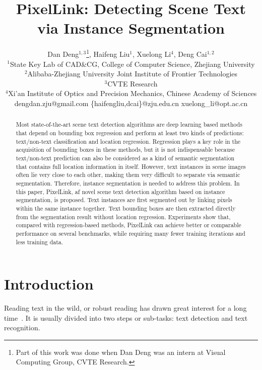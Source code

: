 \documentclass[letterpaper]{article} \usepackage{aaai18}  \usepackage{times}  \usepackage{helvet}  \usepackage{courier}  \usepackage{url}  \usepackage{graphicx}
\begin{document}
\title{PixelLink: Detecting Scene Text via Instance Segmentation}
	\author{Dan Deng$^{1,3}$\thanks{Part of this work was done when Dan Deng was an intern at Visual Computing Group, CVTE Research.}, \quad Haifeng Liu$^{1}$, \quad Xuelong Li$^{4}$, \quad Deng Cai$^{1,2}$ \\
		$^{1}$State Key Lab of CAD\&CG, College of Computer Science, Zhejiang University\\
		$^{2}$Alibaba-Zhejiang University Joint Institute of Frontier Technologies\\
		$^{3}$CVTE Research\\
		$^{4}$Xi'an Institute of Optics and Precision Mechanics, Chinese Academy of Sciences \\
		dengdan.zju@gmail.com \quad  \{haifengliu,dcai\}@zju.edu.cn \quad  xuelong\_li@opt.ac.cn\\
	}
	\maketitle
	\begin{abstract}
		Most state-of-the-art scene text detection algorithms are deep learning based methods that depend on bounding box regression and perform at least two kinds of predictions: text/non-text classification and location regression. Regression plays a key role in the acquisition of bounding boxes in these methods, but it is not indispensable because text/non-text prediction can also be considered as a kind of semantic segmentation that contains full location information in itself. However, text instances in scene images often lie very close to each other, making them very difficult to separate via semantic segmentation. Therefore, instance segmentation is needed to address this problem. In this paper, PixelLink, aƒ novel scene text detection algorithm based on instance segmentation, is proposed. Text instances are first segmented out by linking pixels within the same instance together. Text bounding boxes are then extracted directly from the segmentation result without location regression. Experiments show that, compared with regression-based methods, PixelLink can achieve better or comparable performance on several benchmarks, while requiring many fewer training iterations and less training data.
	\end{abstract}
	
	\section{Introduction}
Reading text in the wild, or robust reading has drawn great interest for a long time~\cite{Ye2015Survey}. It is usually divided into two steps or sub-tasks: text detection and text recognition.
	
\end{document}
